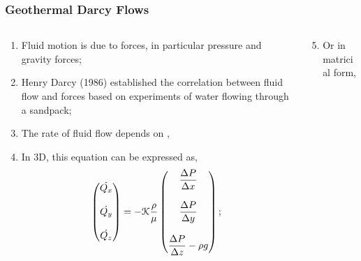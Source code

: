 \documentclass[10pt,compress,unknownkeysallowed]{beamer}
\begin{document}
\begin{frame}
 \frametitle{Geothermal Darcy Flows}
  \begin{columns}
   \begin{column}[c]{0.45\linewidth}
    \begin{enumerate}[1.] \scriptsize
       \item <1-> Fluid motion is due to forces, in particular pressure and gravity forces;
       \item <2-> Henry Darcy (1986) established the correlation between fluid flow and forces based on experiments of water flowing through a sandpack;
       \item <3-> The rate of fluid flow depends on ,
       \item <4-> In 3D, this equation can be expressed as, 
          \begin{displaymath}
            \begin{pmatrix} \dot{Q_{x}}\\ \\\dot{Q_{y}}\\ \\\dot{Q_{z}}\end{pmatrix} = - \mathcal{K} \displaystyle\frac{\rho}{\mu} \begin{pmatrix} \displaystyle\frac{\Delta P}{\Delta x} \\ \\\displaystyle\frac{\Delta P}{\Delta y} \\ \\\displaystyle\frac{\Delta P}{\Delta z}-\rho g \end{pmatrix};
          \end{displaymath}
    \end{enumerate}
   \end{column}
   \begin{column}[c]{0.55\linewidth}
    \begin{enumerate}[1.]\setcounter{enumi}{4} \scriptsize
       \item <5-> Or in matricial form,
    \end{enumerate}
     \begin{center}
     \end{center}
   \end{column}  
  \end{columns}
\end{frame}
\end{document}
